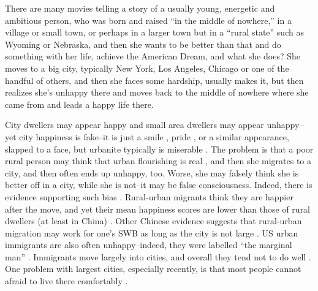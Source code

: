 \documentclass[10pt, letterpaper]{article}
\begin{document}
\begin{spacing}{2.0}
There are %
 many  movies telling a story of a usually young, energetic and  ambitious person, who was
born and raised ``in the middle of nowhere,'' in a village or small town, or
perhaps in a larger town but in a ``rural state'' such as Wyoming or Nebraska,
and then  she wants to be better than that and do something with her
life, achieve the American Dream, and what she does? She moves to a
big city, typically New York, Los Angeles, Chicago or one of the handful of
others, and then she faces some hardship, usually makes it, but then 
realizes she's unhappy there and moves back to the middle of nowhere where she
came from and leads a happy life there.

City dwellers may appear happy and
small area dwellers may appear unhappy--yet city happiness
is fake--it is just a smile \citep{aok-sizeFetish17}, pride \citep{balducci09},
or a similar appearance, slapped to a face, but urbanite typically is miserable
\citep{aokCityBook15}. The problem is that a poor rural person may think that
urban flourishing 
is real%
, and then she migrates to a city, and then 
often ends up unhappy, too. Worse, she may falsely think she is better off in a
city, while she is not--it may be false consciousness. %
 Indeed, there is evidence supporting such bias \citep{aok-sizeFetish17,balducci09}.
Rural-urban migrants think
they are happier after the move, and yet their mean happiness scores are
lower than those of rural dwellers (at least in China)
\citep{knight10}. Other Chinese evidence suggests that rural-urban migration may
work for one's SWB as long as the city is not large \citep{chen15}. 
%
US urban immigrants are also often unhappy--indeed, they were labelled ``the
marginal man'' \citep{park28}.
%
Immigrants move largely into cities, and overall they tend not to do well
\citep{malangaCJ06summer, hymowitzCJ17autumn}.%
%
One problem with largest cities, especially recently, is that most people cannot afraid to live there comfortably \citep{floridaCL16apr28}.
%


\end{spacing}
\end{document}
